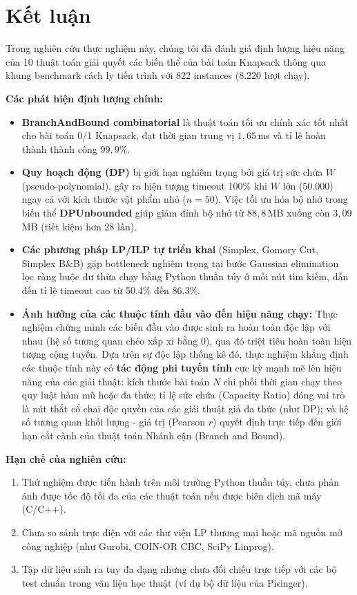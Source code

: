 \documentclass[fontsize=13pt,a4paper]{report}
\begin{document}
\clearpage
\section{Kết luận}
\label{sec:concl}

Trong nghiên cứu thực nghiệm này, chúng tôi đã đánh giá định lượng hiệu năng của 10 thuật toán giải quyết các biến thể của bài toán Knapsack thông qua khung benchmark cách ly tiến trình với 822 instances (8.220 lượt chạy). 

\textbf{Các phát hiện định lượng chính:}
\begin{itemize}[leftmargin=*]
    \item \textbf{BranchAndBound combinatorial} là thuật toán tối ưu chính xác tốt nhất cho bài toán 0/1 Knapsack, đạt thời gian trung vị $1,65$\,ms và tỉ lệ hoàn thành thành công $99,9\%$.
    \item \textbf{Quy hoạch động (DP)} bị giới hạn nghiêm trọng bởi giá trị sức chứa $W$ (pseudo-poly\-no\-mial), gây ra hiện tượng timeout 100\% khi $W$ lớn ($50.000$) ngay cả với kích thước vật phẩm nhỏ ($n=50$). Việc tối ưu hóa bộ nhớ trong biến thể \textbf{DP\-Un\-bound\-ed} giúp giảm đỉnh bộ nhớ từ $88,8$\,MB xuống còn $3,09$\,MB (tiết kiệm hơn 28 lần).
    \item \textbf{Các phương pháp LP/ILP tự triển khai} (Simplex, Gomory Cut, Simplex B\&B) gặp bottleneck nghiêm trọng tại bước Gaussian elimination lọc ràng buộc dư thừa chạy bằng Python thuần túy ở mỗi nút tìm kiếm, dẫn đến tỉ lệ timeout cao từ 50.4\% đến 86.3\%.
    \item \textbf{Ảnh hưởng của các thuộc tính đầu vào đến hiệu năng chạy:} Thực nghiệm chứng minh các biến đầu vào được sinh ra hoàn toàn độc lập với nhau (hệ số tương quan chéo xấp xỉ bằng $0$), qua đó triệt tiêu hoàn toàn hiện tượng cộng tuyến. Dựa trên sự độc lập thống kê đó, thực nghiệm khẳng định các thuộc tính này có \textbf{tác động phi tuyến tính} cực kỳ mạnh mẽ lên hiệu năng của các giải thuật: kích thước bài toán $N$ chi phối thời gian chạy theo quy luật hàm mũ hoặc đa thức; tỉ lệ sức chứa (Capacity Ratio) đóng vai trò là nút thắt cổ chai độc quyền của các giải thuật giả đa thức (như DP); và hệ số tương quan khối lượng - giá trị (Pearson $r$) quyết định trực tiếp đến giới hạn cắt cành của thuật toán Nhánh cận (Branch and Bound).
\end{itemize}

\textbf{Hạn chế của nghiên cứu:}
\begin{enumerate}[leftmargin=*]
    \item Thử nghiệm được tiến hành trên môi trường Python thuần túy, chưa phản ánh được tốc độ tối đa của các thuật toán nếu được biên dịch mã máy (C/C++).
    \item Chưa so sánh trực diện với các thư viện LP thương mại hoặc mã nguồn mở công nghiệp (như Gurobi, COIN-OR CBC, SciPy Linprog).
    \item Tập dữ liệu sinh ra tuy đa dạng nhưng chưa đối chiếu trực tiếp với các bộ test chuẩn trong văn liệu học thuật (ví dụ bộ dữ liệu của Pisinger).
\end{enumerate}
\end{document}
